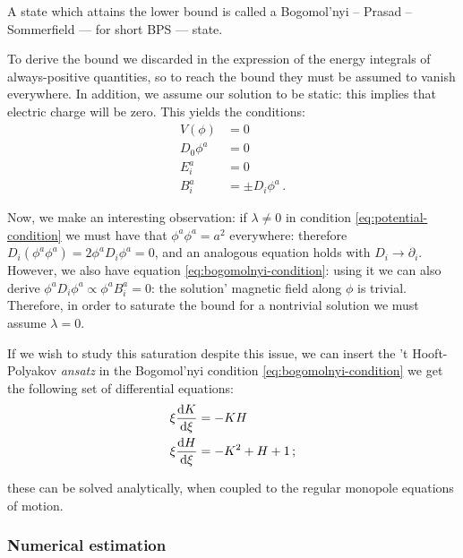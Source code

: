 \documentclass[main.tex]{subfiles}
\begin{document}
A state which attains the lower bound is called a Bogomol'nyi – Prasad – Sommerfield --- for short BPS --- state.

To derive the bound we discarded in the expression of the energy integrals of always-positive quantities, so to reach the bound they must be assumed to vanish everywhere. In addition, we assume our solution to be static: this implies that electric charge will be zero. This yields the conditions:
%
\begin{subequations}
\begin{align}
  V(\phi) &= 0 \label{eq:potential-condition}   \\
  D_0 \phi^a &= 0  \\
  E_i^a &= 0  \\
  B_i^a &= \pm D_i \phi^a  \label{eq:bogomolnyi-condition} \,.
\end{align}
\end{subequations}

Now, we make an interesting observation: if \(\lambda \neq 0\) in condition \eqref{eq:potential-condition} we must have that \(\phi^a \phi^a = a^2\) everywhere: therefore \(D_i (\phi^a \phi^a) = 2 \phi^a D_i \phi^a = 0\), and an analogous equation holds with \(D_i \rightarrow \partial_i\).
However, we also have equation \eqref{eq:bogomolnyi-condition}: using it we can also derive \(\phi^a D_i \phi^a \propto \phi^a B_i^a = 0\): the solution' magnetic field along \(\phi \) is trivial.
Therefore, in order to saturate the bound for a nontrivial solution we must assume \(\lambda = 0\).

If we wish to study this saturation despite this issue, we can insert the 't Hooft-Polyakov \emph{ansatz} in the Bogomol'nyi condition \eqref{eq:bogomolnyi-condition} we get the following set of differential equations:
%
\begin{subequations}
\begin{align}
  \xi \dv{K}{\xi}  &=  -KH   \\
  \xi \dv{H}{\xi} &= -K^2 + H + 1 \,;
\end{align}
\end{subequations}

these can be solved analytically, when coupled to the regular monopole equations of motion.


\subsubsection{Numerical estimation}
\end{document}
